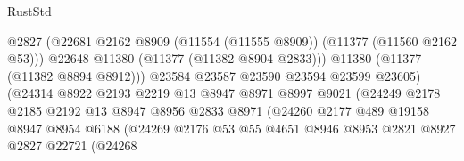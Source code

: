 \begin{lexlean}{RustStd}
\begin{coremodule}
                                          @2827
                                          (@22681
                                            @2162
                                            @8909
                                            (@11554 (@11555 @8909))
                                            (@11377 (@11560 @2162 @53)))
                                          @22648
                                          @11380
                                          (@11377 (@11382 @8904 @2833)))
                                        @11380
                                        (@11377 (@11382 @8894 @8912)))
                                      @23584
                                      @23587
                                      @23590
                                      @23594
                                      @23599
                                      @23605)
                                    (@24314
                                      @8922
                                      @2193
                                      @2219
                                      @13
                                      @8947
                                      @8971
                                      @8997
                                      @9021
                                      (@24249
                                        @2178
                                        @2185
                                        @2192
                                        @13
                                        @8947
                                        @8956
                                        @2833
                                        @8971
                                        (@24260
                                          @2177
                                          @489
                                          @19158
                                          @8947
                                          @8954
                                          @6188
                                          (@24269
                                            @2176
                                            @53
                                            @55
                                            @4651
                                            @8946
                                            @8953
                                            @2821
                                            @8927
                                            @2827
                                            @22721
                                            (@24268

\end{coremodule}
\end{lexlean}
